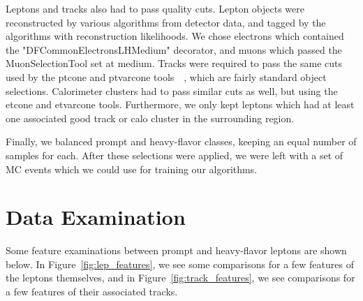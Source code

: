 Leptons and tracks also had to pass quality cuts. Lepton objects were reconstructed by various algorithms from detector data, and tagged by the algorithms with reconstruction likelihoods. We chose electrons which contained the "DFCommonElectronsLHMedium" decorator, and muons which passed the MuonSelectionTool set at medium. Tracks were required to pass the same cuts used by the ptcone and ptvarcone tools~\cite{run2isolation}~\cite{trackingcp}, which are fairly standard object selections. Calorimeter clusters had to pass similar cuts as well, but using the etcone and etvarcone tools. Furthermore, we only kept leptons which had at least one associated good track or calo cluster in the surrounding region.

Finally, we balanced prompt and heavy-flavor classes, keeping an equal number of samples for each. After these selections were applied, we were left with a set of MC events which we could use for training our algorithms.

\section{Data Examination}
 
Some feature examinations between prompt and heavy-flavor leptons are shown below. In Figure~\ref{fig:lep_features}, we see some comparisons for a few features of the leptons themselves, and in Figure~\ref{fig:track_features}, we see comparisons for a few features of their associated tracks.

